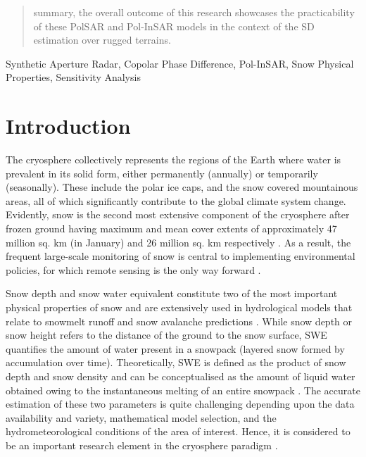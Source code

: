 \documentclass[review]{elsarticle}
\begin{document}
\begin{frontmatter}
\begin{abstract}
summary, the overall outcome of this research showcases the practicability of these PolSAR and Pol-InSAR models in the context of the SD estimation over rugged terrains.
\end{abstract}

\begin{keyword}
Synthetic Aperture Radar, Copolar Phase Difference, Pol-InSAR, Snow Physical Properties, Sensitivity Analysis
\end{keyword}

\end{frontmatter}

\linenumbers

\section{Introduction}
\label{sec:Intro}
The cryosphere collectively represents the regions of the Earth where water is prevalent in its solid form, either permanently (annually) or temporarily (seasonally). These include the polar ice caps, and the snow covered mountainous areas, all of which significantly contribute to the global climate system change. Evidently, snow is the second most extensive component of the cryosphere after frozen ground having maximum and mean cover extents of approximately 47 million sq. km (in January) and 26 million sq. km respectively \citep{Barry2011}. As a result, the frequent large-scale monitoring of snow is central to implementing environmental policies, for which remote sensing is the only way forward \citep{Tedesco2015}.

Snow depth and snow water equivalent constitute two of the most important physical properties of snow and are extensively used in hydrological models that relate to snowmelt runoff and snow avalanche predictions \citep{Thakur2017}. While snow depth or snow height refers to the distance of the ground to the snow surface, SWE quantifies the amount of water present in a snowpack (layered snow formed by accumulation over time). Theoretically, SWE is defined as the product of snow depth and snow density and can be conceptualised as the amount of liquid water obtained owing to the instantaneous melting of
an entire snowpack \citep{Tedesco2015}. The accurate estimation of these two parameters is quite challenging depending upon the data availability and variety, mathematical model selection, and the hydrometeorological conditions of the area of interest. Hence, it is considered to be an important research element in the cryosphere paradigm \citep{Leinss2014, Leinss2015}.
\end{document}
